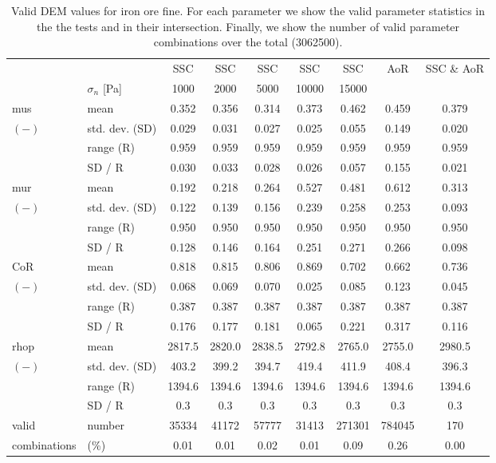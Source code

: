 \begin{table}[htbp] 
 \centering 
\begin{tabular}{ll|ccccccc} 
 \hline 
 &    & SSC & SSC & SSC & SSC & SSC & AoR   & SSC \& AoR \\ 
 & $\sigma_n$  [Pa]  & 1000 & 2000 & 5000 & 10000 & 15000 &  &  \\ 
 \hline 
\acs{mus} & mean & 0.352 & 0.356 & 0.314 & 0.373 & 0.462 & 0.459 & 0.379 \\ 
$(-)$ & std. dev. (SD) & 0.029 & 0.031 & 0.027 & 0.025 & 0.055 & 0.149 & 0.020 \\ 
 & range (\acs{R}) & 0.959 & 0.959 & 0.959 & 0.959 & 0.959 & 0.959 & 0.959 \\ 
 & SD / R & 0.030 & 0.033 & 0.028 & 0.026 & 0.057 & 0.155 & 0.021 \\ 
 \hline 
\acs{mur} & mean & 0.192 & 0.218 & 0.264 & 0.527 & 0.481 & 0.612 & 0.313 \\ 
$(-)$ & std. dev. (SD) & 0.122 & 0.139 & 0.156 & 0.239 & 0.258 & 0.253 & 0.093 \\ 
 & range (\acs{R}) & 0.950 & 0.950 & 0.950 & 0.950 & 0.950 & 0.950 & 0.950 \\ 
 & SD / R & 0.128 & 0.146 & 0.164 & 0.251 & 0.271 & 0.266 & 0.098 \\ 
 \hline 
\acs{CoR} & mean & 0.818 & 0.815 & 0.806 & 0.869 & 0.702 & 0.662 & 0.736 \\ 
$(-)$ & std. dev. (SD) & 0.068 & 0.069 & 0.070 & 0.025 & 0.085 & 0.123 & 0.045 \\ 
 & range (\acs{R}) & 0.387 & 0.387 & 0.387 & 0.387 & 0.387 & 0.387 & 0.387 \\ 
 & SD / R & 0.176 & 0.177 & 0.181 & 0.065 & 0.221 & 0.317 & 0.116 \\ 
 \hline 
\acs{rhop} & mean & 2817.5 & 2820.0 & 2838.5 & 2792.8 & 2765.0 & 2755.0 & 2980.5 \\ 
$(-)$ & std. dev. (SD) & 403.2 & 399.2 & 394.7 & 419.4 & 411.9 & 408.4 & 396.3 \\ 
 & range (\acs{R}) & 1394.6 & 1394.6 & 1394.6 & 1394.6 & 1394.6 & 1394.6 & 1394.6 \\ 
 & SD / R &  0.3 &  0.3 &  0.3 &  0.3 &  0.3 &  0.3 &  0.3 \\ 
 \hline 
valid & number & 35334 & 41172 & 57777 & 31413 & 271301 & 784045 &  170 \\ 
combinations & (\%)  & 0.01 & 0.01 & 0.02 & 0.01 & 0.09 & 0.26 & 0.00 \\ 
 \hline 
\end{tabular} 
\caption[Valid DEM values for iron ore fine]{Valid DEM values for iron ore fine.
For each parameter we show the valid parameter statistics in the the tests and in their intersection. 
Finally, we show the number of valid parameter combinations over the total (3062500).}
\label{tab:28DEMvalidvaluesironorefine} 
\end{table}